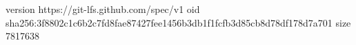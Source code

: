 version https://git-lfs.github.com/spec/v1
oid sha256:3f8802c1c6b2c7fd8fae87427fee1456b3db1f1fcfb3d85cb8d78df178d7a701
size 7817638
